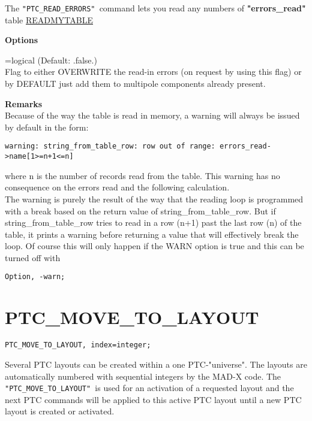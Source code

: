 The \texttt{"PTC\_READ\_ERRORS" }command lets you read any numbers of
\textbf{"errors\_read"} table
\href{../control/general.html#readmytable}{READMYTABLE}  

{\bf Options} \\ 
\begin{madlist}
   =logical (Default: .false.) \\ 
     Flag to either OVERWRITE the read-in errors (on request by
     using this flag) or by DEFAULT just add them to multipole
     components already present.
\end{madlist}

{\bf Remarks}\\
Because of the way the table is read in memory, a warning will always be
issued by default in the form:
\begin{verbatim}
warning: string_from_table_row: row out of range: errors_read->name[1>=n+1<=n]
\end{verbatim}
where n is  the number of records read from the table. 
This warning has no consequence on the errors read and the following
calculation. \\
The warning is purely the result of the way that the reading loop is
programmed with a break based on the return value of
string\_from\_table\_row.  
But if string\_from\_table\_row tries to read in a row (n+1) past the
last row (n) of the table, it prints a warning before returning a value
that will effectively break the loop. Of course this will only happen if
the WARN option is true and this can be turned off with  
\begin{verbatim}
Option, -warn;
\end{verbatim}

       
\section{PTC\_MOVE\_TO\_LAYOUT}

\begin{verbatim}
PTC_MOVE_TO_LAYOUT, index=integer;
\end{verbatim}


Several PTC layouts can be created within a one PTC-"universe". The
layouts are automatically numbered with sequential integers  by the
MAD-X code. The \texttt{"PTC\_MOVE\_TO\_LAYOUT" }is used for an
activation of a requested layout and the next PTC commands will be
applied to this active PTC layout until a new PTC layout is created
or activated. 

